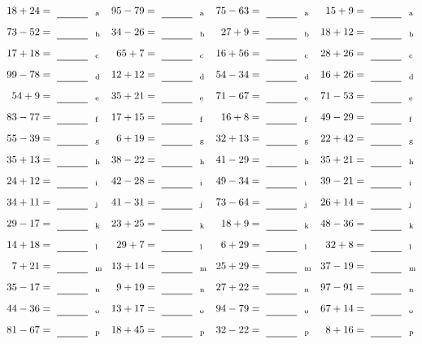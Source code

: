\documentclass
[
  draft    = true,
  fontsize = 11pt,
  parskip  = half-
]
{scrartcl}
\begin{document}
\clearpage
\begin{align*}
    \pline{18+24}&=\rline{a}
  & \pline{95-79}&=\rline{a}
  & \pline{75-63}&=\rline{a}
  & \pline{15+9}&=\rline{a} \\[1ex]
    \pline{73-52}&=\rline{b}
  & \pline{34-26}&=\rline{b}
  & \pline{27+9}&=\rline{b}
  & \pline{18+12}&=\rline{b} \\[1ex]
    \pline{17+18}&=\rline{c}
  & \pline{65+7}&=\rline{c}
  & \pline{16+56}&=\rline{c}
  & \pline{28+26}&=\rline{c} \\[1ex]
    \pline{99-78}&=\rline{d}
  & \pline{12+12}&=\rline{d}
  & \pline{54-34}&=\rline{d}
  & \pline{16+26}&=\rline{d} \\[1ex]
    \pline{54+9}&=\rline{e}
  & \pline{35+21}&=\rline{e}
  & \pline{71-67}&=\rline{e}
  & \pline{71-53}&=\rline{e} \\[1ex]
    \pline{83-77}&=\rline{f}
  & \pline{17+15}&=\rline{f}
  & \pline{16+8}&=\rline{f}
  & \pline{49-29}&=\rline{f} \\[1ex]
    \pline{55-39}&=\rline{g}
  & \pline{6+19}&=\rline{g}
  & \pline{32+13}&=\rline{g}
  & \pline{22+42}&=\rline{g} \\[1ex]
    \pline{35+13}&=\rline{h}
  & \pline{38-22}&=\rline{h}
  & \pline{41-29}&=\rline{h}
  & \pline{35+21}&=\rline{h} \\[1ex]
    \pline{24+12}&=\rline{i}
  & \pline{42-28}&=\rline{i}
  & \pline{49-34}&=\rline{i}
  & \pline{39-21}&=\rline{i} \\[1ex]
    \pline{34+11}&=\rline{j}
  & \pline{41-31}&=\rline{j}
  & \pline{73-64}&=\rline{j}
  & \pline{26+14}&=\rline{j} \\[1ex]
    \pline{29-17}&=\rline{k}
  & \pline{23+25}&=\rline{k}
  & \pline{18+9}&=\rline{k}
  & \pline{48-36}&=\rline{k} \\[1ex]
    \pline{14+18}&=\rline{l}
  & \pline{29+7}&=\rline{l}
  & \pline{6+29}&=\rline{l}
  & \pline{32+8}&=\rline{l} \\[1ex]
    \pline{7+21}&=\rline{m}
  & \pline{13+14}&=\rline{m}
  & \pline{25+29}&=\rline{m}
  & \pline{37-19}&=\rline{m} \\[1ex]
    \pline{35-17}&=\rline{n}
  & \pline{9+19}&=\rline{n}
  & \pline{27+22}&=\rline{n}
  & \pline{97-91}&=\rline{n} \\[1ex]
    \pline{44-36}&=\rline{o}
  & \pline{13+17}&=\rline{o}
  & \pline{94-79}&=\rline{o}
  & \pline{67+14}&=\rline{o} \\[1ex]
    \pline{81-67}&=\rline{p}
  & \pline{18+45}&=\rline{p}
  & \pline{32-22}&=\rline{p}
  & \pline{8+16}&=\rline{p}
\end{align*}
\end{document}

